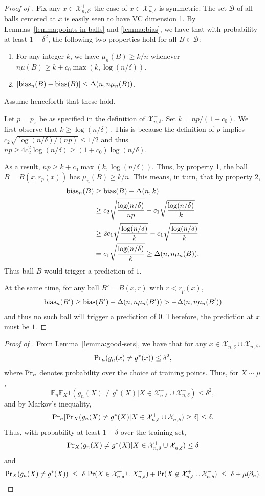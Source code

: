 \documentclass{article}
\def\pr{{\rm Pr}}
\def\E{{\mathbb E}}
\def\X{{\mathcal X}}
\def\B{{\mathcal B}}
\def\bias{{\rm bias}}
\begin{document}
\begin{proof}[Proof of ]
Fix any $x \in \X^+_{n,\delta}$; the case of $x \in \X^-_{n,\delta}$ is symmetric. The set $\B$ of all balls centered at $x$ is easily seen to have VC dimension 1. By Lemmas~\ref{lemma:points-in-balls} and \ref{lemma:bias}, we have that with probability at least $1-\delta^2$, the following two properties hold for all $B \in \B$:
\begin{enumerate}
\item For any integer $k$, we have $\mu_n(B) \geq k/n$ whenever $n \mu(B) \geq k + c_0 \max(k, \log (n/\delta))$.
\item $|\bias_n(B) - \bias(B)| \leq \Delta(n, n \mu_n(B))$.
\end{enumerate}
Assume henceforth that these hold.

Let $p = p_x$ be as specified in the definition of $\X^+_{n,\delta}$. Set $k = np/(1 + c_0)$. We first observe that $k \geq \log (n/\delta)$. This is because the definition of $p$ implies $c_2 \sqrt{\log (n/\delta)/(np)} \leq 1/2$ and thus $np \geq 4 c_2^2 \log (n/\delta) \geq (1+c_0) \log (n/\delta)$.

As a result, $np \geq k + c_0 \max(k, \log (n/\delta))$. Thus, by property 1, the ball $B = B(x, r_p(x))$ has $\mu_n(B) \geq k/n$. This means, in turn, that by property 2,
\begin{align*}
\bias_n(B) &\geq \bias(B) - \Delta(n, k) \\
&\geq c_2 \sqrt{\frac{\log (n/\delta)}{np}} - c_1 \sqrt{\frac{\log (n/\delta)}{k}} \\
&\geq 2c_1 \sqrt{\frac{\log (n/\delta)}{k}} - c_1 \sqrt{\frac{\log (n/\delta)}{k}} \\
&= c_1 \sqrt{\frac{\log (n/\delta)}{k}} \geq \Delta(n, n \mu_n(B)) .
\end{align*}
Thus ball $B$ would trigger a prediction of $1$.

At the same time, for any ball $B' = B(x, r)$ with $r < r_p(x)$,
$$ \bias_n(B') \geq \bias(B') - \Delta(n, n \mu_n(B')) > -\Delta(n, n \mu_n(B')) $$
and thus no such ball will trigger a prediction of $0$. Therefore, the prediction at $x$ must be $1$.
\end{proof}


\begin{proof}[Proof of ]
From Lemma~\ref{lemma:good-sets}, we have that for any $x \in \X^+_{n,\delta} \cup \X^-_{n,\delta}$, 
$$ \pr_n(g_n(x) \neq g^*(x)) \leq \delta^2 ,$$
where $\pr_n$ denotes probability over the choice of training points. Thus, for $X \sim \mu$,
$$ \E_n \E_X 1(g_n(X) \neq g^*(X) | X \in \X^+_{n,\delta} \cup \X^-_{n,\delta}) \leq \delta^2 ,$$
and by Markov's inequality,
$$ \pr_n [\pr_X (g_n(X) \neq g^*(X) |  X \in \X^+_{n,\delta} \cup \X^-_{n,\delta}) \geq \delta] \leq \delta.$$
Thus, with probability at least $1-\delta$ over the training set,
$$\pr_X (g_n(X) \neq g^*(X) |  X \in \X^+_{n,\delta} \cup \X^-_{n,\delta}) \leq \delta$$
and
$$ \pr_X(g_n(X) \neq g^*(X)) 
\ \leq \ \delta \ \pr(X \in \X^+_{n,\delta} \cup X^-_{n,\delta}) + \pr(X \not\in \X^+_{n,\delta} \cup \X^-_{n,\delta})
\ \leq \ \delta + \mu(\partial_n) .$$
\end{proof}
\end{document}
